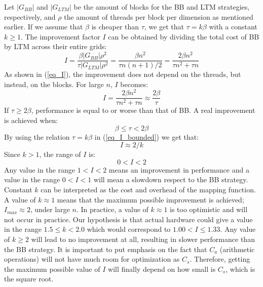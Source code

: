 \documentclass[conference]{IEEEtran}
\begin{document}
Let $|G_{BB}|$ and $|G_{LTM}|$ be the amount of blocks for the BB and LTM strategies, respectively, and $\rho$ the amount of threads 
per block per dimension as mentioned earlier. If we assume that $\beta$ is cheaper than $\tau$, we get that $\tau = k\beta$ with a 
constant $k \ge 1$. The improvement factor $I$ can be obtained by dividing the total cost of BB by LTM across their entire 
grids:
\begin{equation}
I = \frac{\beta|G_{BB}|\rho^2}{\tau|G_{LTM}|\rho^2} = \frac{\beta n^2}{\tau n(n+1)/2} = \frac{2\beta n^2}{\tau n^2 + \tau n}
\label{eq_I}
\end{equation}
As shown in (\ref{eq_I}), the improvement does not depend on the threads, but instead, on the blocks. For large $n$, $I$ becomes:
\begin{equation}
I = \frac{2\beta n^2}{\tau n^2 + \tau n} \approx \frac{2\beta}{\tau}
\label{eq_I_bounded}
\end{equation}
If $\tau \ge 2\beta$, performance is equal to or worse than that of BB. 
A real improvement is achieved when:
\begin{equation}
\beta \le \tau < 2\beta
\label{eq_tau_range}
\end{equation}
By using the relation $\tau = k\beta$ in (\ref{eq_I_bounded}) we get that:
\begin{equation}
I \approx 2/k
\end{equation}
Since $k > 1$, the range of $I$ is:
\begin{equation}
0 < I < 2
\end{equation}
Any value in the range $1< I < 2$ means an improvement in performance and a value in the range $0 < I < 1$ will mean a 
slowdown respect to the BB strategy.
Constant $k$ can be interpreted as the cost and overhead of the mapping function. 
A value of $k\approx1$ means that the maximum possible improvement is achieved; $I_{max} \approx 2$, under large $n$.
In practice, a value of $k\approx1$ is too optimistic and will not occur in practice. Our hypothesis is that actual hardware could give a value in the range 
$1.5 \le k < 2.0$ which would correspond to $1.00 < I \le 1.33$. Any value of $k \ge 2$ will lead 
to no improvement at all, resulting in slower performance than the BB strategy. 
It is important to put emphasis on the fact that $C_a$ (arithmetic operations) will not have much room for optimization as $C_s$. 
Therefore, getting the maximum possible value of $I$ will finally depend on how small is $C_s$, which is the square root. 
\end{document}
